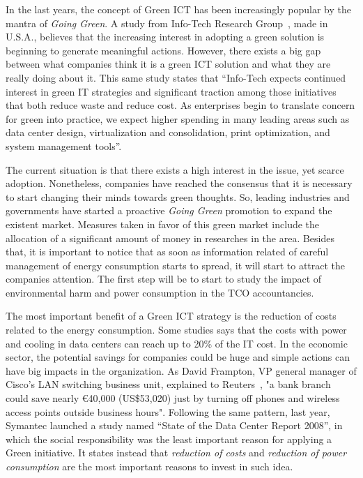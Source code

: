     In the last years, the concept of Green ICT has been increasingly popular by the mantra of \emph{Going Green}. A study from Info-Tech Research Group~\cite{info-tech07}, made in U.S.A., believes that the increasing interest in adopting a green solution is beginning to generate meaningful actions. However, there exists a big gap between what companies think it is a green ICT solution and what they are really doing about it. This same study states that ``Info-Tech expects continued interest in green IT strategies and significant traction among those initiatives that both reduce waste and reduce cost. As enterprises begin to translate concern for green into practice, we expect higher spending in many leading areas such as data center design, virtualization and consolidation, print optimization, and system management tools''.
    
    The current situation is that there exists a high interest in the issue, yet scarce adoption. Nonetheless, companies have reached the consensus that it is necessary to start changing their minds towards green thoughts. So, leading industries and governments have started a proactive \emph{Going Green} promotion to expand the existent market. Measures taken in favor of this green market include the allocation of a significant amount of money in researches in the area. Besides that, it is important to notice that as soon as information related of careful management of energy consumption starts to spread, it will start to attract the companies attention. The first step will be to start to study the impact of environmental harm and power consumption in the TCO accountancies.
    
    The most important benefit of a Green ICT strategy is the reduction of costs related to the energy consumption. Some studies says that the costs with power and cooling in data centers can reach up to 20\% of the IT cost. In the economic sector, the potential savings for companies could be huge and simple actions can have big impacts in the organization. As David Frampton, VP general manager of Cisco's LAN switching business unit, explained to Reuters~\cite{Chestney2009}, "a bank branch could save nearly \euro40,000 (US\$53,020) just by turning off phones and wireless access points outside business hours". Following the same pattern, last year, Symantec launched a study named ``State of the Data Center Report 2008'', in which the social responsibility was the least important reason for applying a Green initiative. It states instead that \emph{reduction of costs} and \emph{reduction of power consumption} are the most important reasons to invest in such idea. 
    
